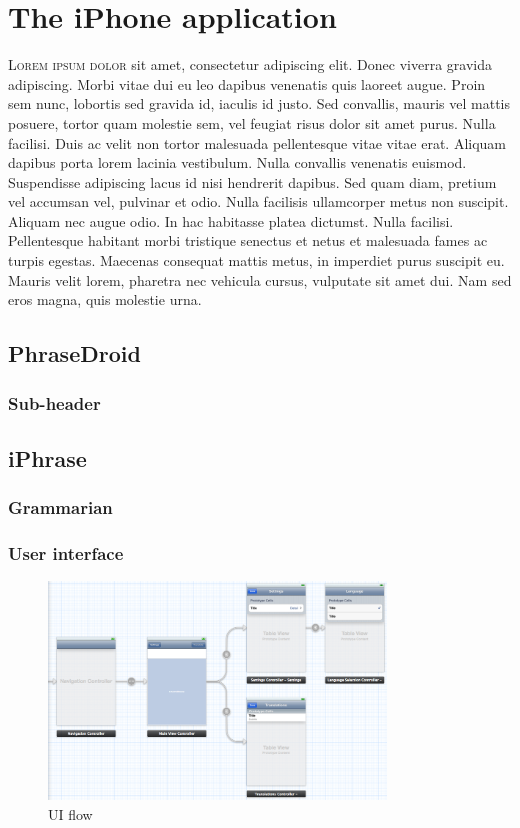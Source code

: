 \chapter{The iPhone application}
\lettrine[lines=4, loversize=-0.1, lraise=0.1]{L}{orem ipsum dolor} sit amet, consectetur adipiscing elit. Donec viverra gravida adipiscing. Morbi vitae dui eu leo dapibus venenatis quis laoreet augue. Proin sem nunc, lobortis sed gravida id, iaculis id justo. Sed convallis, mauris vel mattis posuere, tortor quam molestie sem, vel feugiat risus dolor sit amet purus. Nulla facilisi. Duis ac velit non tortor malesuada pellentesque vitae vitae erat. Aliquam dapibus porta lorem lacinia vestibulum. Nulla convallis venenatis euismod. Suspendisse adipiscing lacus id nisi hendrerit dapibus. Sed quam diam, pretium vel accumsan vel, pulvinar et odio. Nulla facilisis ullamcorper metus non suscipit. Aliquam nec augue odio. In hac habitasse platea dictumst. Nulla facilisi. Pellentesque habitant morbi tristique senectus et netus et malesuada fames ac turpis egestas. Maecenas consequat mattis metus, in imperdiet purus suscipit eu. Mauris velit lorem, pharetra nec vehicula cursus, vulputate sit amet dui. Nam sed eros magna, quis molestie urna.

\section{PhraseDroid}
\subsection{Sub-header}

\section{iPhrase}
\subsection{Grammarian}

\subsection{User interface}
\begin{figure}[htb]
\centering
\includegraphics[width=0.8\textwidth]{fig/storyboard}
\caption{UI flow}
\label{fig:storyboard}
\end{figure}


